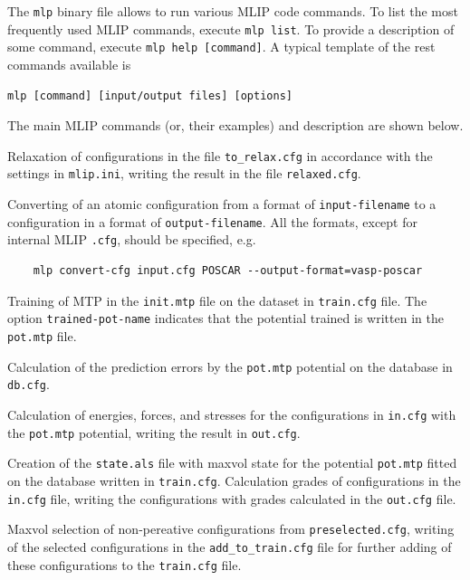 \documentclass[12pt]{article}
\renewcommand{\_}{\char`_}
\begin{document}
The \verb|mlp| binary file allows to run various MLIP code commands. To list the most frequently used MLIP commands, execute \verb|mlp list|. To provide a description of some command, execute \verb|mlp help [command]|. A typical template of the rest commands available is 
\begin{verbatim}
mlp [command] [input/output files] [options]
\end{verbatim}
The main MLIP commands (or, their examples) and description are shown below.
\begin{description}[style=nextline,leftmargin=\widthof{\ttfamily XXX|},font=\normalfont\ttfamily]
	\item[mlp relax mlip.ini --cfg-filename=to\_relax.cfg --save-relaxed=relaxed.cfg] Relaxation of configurations in the file \verb|to_relax.cfg| in accordance with the settings in \verb|mlip.ini|, writing the result in the file \verb|relaxed.cfg|.
	\item[mlp convert-cfg <input-filename> <output-filename> --options ]
	Converting of an atomic configuration from a format of \verb|input-filename| to a configuration in a format of \verb|output-filename|. All the formats, except for internal MLIP \verb|.cfg|, should be specified, e.g.
	\begin{verbatim}
	mlp convert-cfg input.cfg POSCAR --output-format=vasp-poscar
	\end{verbatim}
	\item[mlp train init.mtp train.cfg --trained-pot-name=pot.mtp ]
	Training of MTP in the \verb|init.mtp| file on the dataset in \verb|train.cfg| file. The option \verb|trained-pot-name| indicates that the potential trained is written in the \verb|pot.mtp| file.
	\item[mlp calc-errors pot.mtp db.cfg ]
	Calculation of the prediction errors by the \verb|pot.mtp| potential on the database in \verb|db.cfg|.
	\item[mlp calc-efs pot.mtp in.cfg out.cfg ]
	Calculation of energies, forces, and stresses for the configurations in \verb|in.cfg| with the \verb|pot.mtp| potential, writing the result in \verb|out.cfg|.
	\item[mlp calc-grade pot.mtp train.cfg in.cfg out.cfg --als-filename=state.als ]
	Creation of the \verb|state.als| file with maxvol state for the potential \verb|pot.mtp| fitted on the database written in \verb|train.cfg|. Calculation grades of configurations in the \verb|in.cfg| file, writing the configurations with grades calculated in the \verb|out.cfg| file.
	
	\item[mlp select-add pot.mtp train.cfg preselected.cfg add\_to\_train.cfg ]
	Maxvol selection of non-pereative configurations from \verb|preselected.cfg|, writing of the selected configurations in the \verb|add_to_train.cfg| file for further adding of these configurations to the \verb|train.cfg| file.
	
\end{description} 
\end{document}

